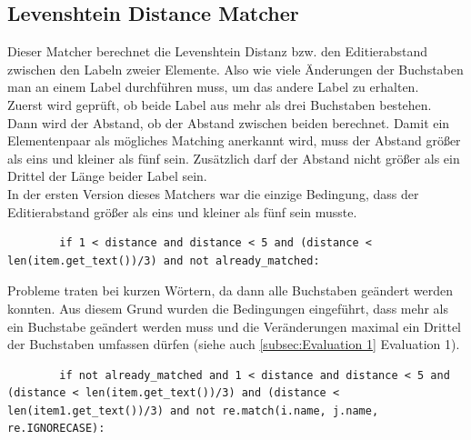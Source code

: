 		\subsection{Levenshtein Distance Matcher}
		Dieser Matcher berechnet die Levenshtein Distanz bzw. den Editierabstand
		zwischen den Labeln zweier Elemente. Also wie viele Änderungen der Buchstaben
		man an einem Label durchführen muss, um das andere Label zu erhalten.\\
		Zuerst wird geprüft, ob beide Label aus mehr als drei Buchstaben bestehen.
		Dann wird der Abstand, ob der Abstand zwischen beiden berechnet. Damit ein
		Elementenpaar als mögliches Matching anerkannt wird, muss der Abstand größer
		als eins und kleiner als fünf sein. Zusätzlich darf der Abstand nicht größer
		als ein Drittel der Länge beider Label sein.\\
		In der ersten Version dieses Matchers war die einzige Bedingung, dass der
		Editierabstand größer als eins und kleiner als fünf sein musste.
		\begin{lstlisting}
		if 1 < distance and distance < 5 and (distance < len(item.get_text())/3) and not already_matched:
		\end{lstlisting}
		Probleme traten bei kurzen Wörtern, da dann alle Buchstaben geändert werden
		konnten. Aus diesem Grund wurden die Bedingungen eingeführt, dass mehr als ein Buchstabe
		geändert werden muss und die Veränderungen maximal ein Drittel der Buchstaben
		umfassen dürfen (siehe auch \ref{subsec:Evaluation 1} Evaluation 1).
		\begin{lstlisting}
		if not already_matched and 1 < distance and distance < 5 and (distance < len(item.get_text())/3) and (distance < len(item1.get_text())/3) and not re.match(i.name, j.name, re.IGNORECASE):
		\end{lstlisting}
				
